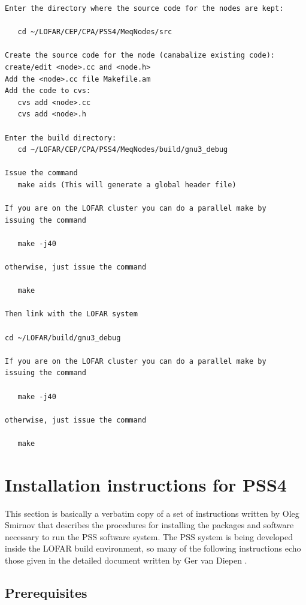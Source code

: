 \documentclass[10pt]{article}
\begin{document}
\begin{verbatim}
Enter the directory where the source code for the nodes are kept:

   cd ~/LOFAR/CEP/CPA/PSS4/MeqNodes/src

Create the source code for the node (canabalize existing code):
create/edit <node>.cc and <node.h>
Add the <node>.cc file Makefile.am
Add the code to cvs:
   cvs add <node>.cc
   cvs add <node>.h

Enter the build directory:
   cd ~/LOFAR/CEP/CPA/PSS4/MeqNodes/build/gnu3_debug

Issue the command
   make aids (This will generate a global header file)

If you are on the LOFAR cluster you can do a parallel make by
issuing the command

   make -j40

otherwise, just issue the command

   make

Then link with the LOFAR system

cd ~/LOFAR/build/gnu3_debug

If you are on the LOFAR cluster you can do a parallel make by
issuing the command

   make -j40 

otherwise, just issue the command

   make
\end{verbatim}

\section {Installation instructions for PSS4}
This section is basically a verbatim copy of a set of instructions
written by Oleg Smirnov that describes the procedures for installing the 
packages and software necessary to run the PSS software system.
The PSS system is being developed inside the LOFAR build environment,
so many of the following instructions echo those given in the detailed
document written by Ger van Diepen \cite{diepen}.

\subsection{Prerequisites} 
  
\end{document}

